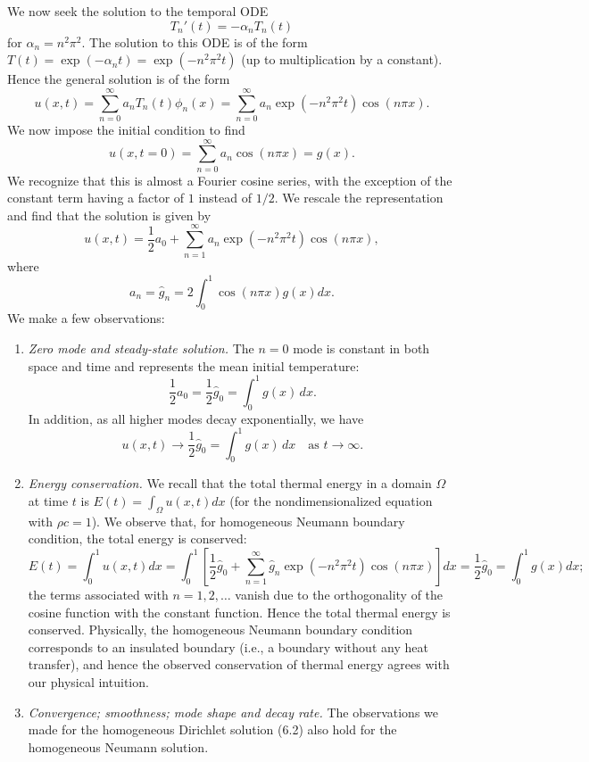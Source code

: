 We now seek the solution to the temporal ODE
\[T_n'(t) = -\alpha_n T_n(t)\]
for $\alpha_n = n^2\pi^2$. The solution to this ODE is of the form $T(t) = \exp(-\alpha_n t) = \exp(-n^2\pi^2 t)$ (up to multiplication by a constant). Hence the general solution is of the form
\[u(x, t) = \sum_{n=0}^{\infty} a_n T_n(t) \phi_n(x) = \sum_{n=0}^{\infty} a_n \exp(-n^2\pi^2 t) \cos(n\pi x).\]
We now impose the initial condition to find
\[u(x, t = 0) = \sum_{n=0}^{\infty} a_n \cos(n\pi x) = g(x).\]
We recognize that this is almost a Fourier cosine series, with the exception of the constant term having a factor of $1$ instead of $1/2$. We rescale the representation and find that the solution is given by
\[u(x, t) = \frac{1}{2} a_0 + \sum_{n=1}^{\infty} a_n \exp(-n^2\pi^2 t) \cos(n\pi x),\]
where
\[a_n = \hat{g}_n = 2 \int_0^1 \cos(n\pi x) g(x) dx.\]
We make a few observations:
\begin{enumerate}
    \item \textit{Zero mode and steady-state solution.} The $n = 0$ mode is constant in both space and time and represents the mean initial temperature:
    \[\frac{1}{2} a_0 = \frac{1}{2} \hat{g}_0 = \int_0^1 g(x)\,dx.\]
    In addition, as all higher modes decay exponentially, we have
    \[u(x, t) \to \frac{1}{2} \hat{g}_0 = \int_0^1 g(x)\,dx \quad \text{as } t \to \infty.\]
    \item \textit{Energy conservation.} We recall that the total thermal energy in a domain $\Omega$ at time $t$ is $E(t) = \int_\Omega u(x, t) dx$ (for the nondimensionalized equation with $\rho c = 1$). We observe that, for homogeneous Neumann boundary condition, the total energy is conserved:
    \[E(t) = \int_0^1 u(x, t) dx = \int_0^1 \left[\frac{1}{2} \hat{g}_0 + \sum_{n=1}^{\infty} \hat{g}_n \exp(-n^2\pi^2 t) \cos(n\pi x)\right] dx = \frac{1}{2} \hat{g}_0 = \int_0^1 g(x) dx;\]
    the terms associated with $n = 1, 2, \dots$ vanish due to the orthogonality of the cosine function with the constant function. Hence the total thermal energy is conserved. Physically, the homogeneous Neumann boundary condition corresponds to an insulated boundary (i.e., a boundary without any heat transfer), and hence the observed conservation of thermal energy agrees with our physical intuition.
    \item \textit{Convergence; smoothness; mode shape and decay rate.} The observations we made for the homogeneous Dirichlet solution (6.2) also hold for the homogeneous Neumann solution.
\end{enumerate}

